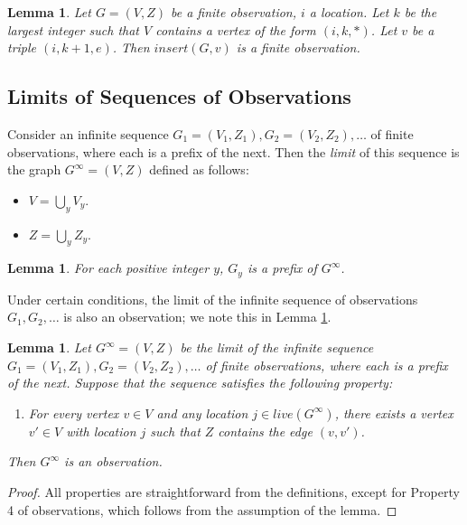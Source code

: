 \documentclass[11pt]{article}
\numberwithin{theorem}{section}
\newtheorem{lemma}[theorem]{Lemma}
\begin{document}
\begin{lemma}
\label{prop:insertVertexYeildsObservation}
Let $G = (V,Z)$ be a finite observation, $i$ a location.
Let $k$ be the largest integer such that $V$ contains a vertex of the
form $(i,k,*)$.
Let $v$ be a triple $(i,k+1,e)$.
Then $insert(G,v)$ is a finite observation.
\end{lemma}

\subsection{Limits of Sequences of Observations}

Consider an infinite sequence $G_1 = (V_1,Z_1), G_2 = (V_2,Z_2),
\ldots$ of finite observations,
where each is a prefix of the next.
Then the \emph{limit} of this sequence is the graph $G^\infty
= (V,Z)$ defined as follows:
\begin{itemize}
\item
$V = \bigcup_y V_y$.
\item
$Z = \bigcup_y Z_y$.
\end{itemize}

\begin{lemma}\label{lem:GxIsPrefixOfGInfty}
For each positive integer $y$, 
$G_y$ is a prefix of $G^\infty$.
\end{lemma}

Under certain conditions, the limit of the infinite sequence of observations $G_1,G_2,\ldots$ is also an observation; we note this in Lemma  \ref{lem:obs:limitObs}.
\begin{lemma}
\label{lem:obs:limitObs}
Let $G^\infty = (V,Z)$ be the limit of the infinite sequence $G_1 =
(V_1,Z_1), G_2 = (V_2,Z_2), \ldots$ of finite observations,
where each is a prefix of the next.
Suppose that the sequence satisfies the following property:
\begin{enumerate}
\item
For every vertex $v \in V$ and any location $j \in live(G^\infty)$,
there exists a vertex $v' \in V$ with location
$j$ such that  $Z$ contains the edge $(v,v')$.
\end{enumerate}
Then $G^\infty$ is an observation.
\end{lemma}

\begin{proof}
All properties are straightforward from the definitions, except for
Property 4 of observations, which follows from the assumption of the
lemma.
\end{proof}
\end{document}
